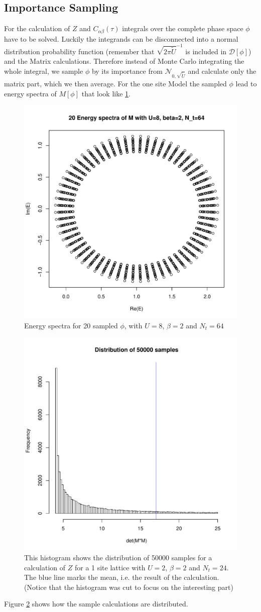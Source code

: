 \subsection{Importance Sampling}
For the calculation of $Z$ and $C_{\alpha\beta}(\tau)$ integrals over the complete phase space $\phi$ have to be solved. Luckily the integrands can be disconnected into a normal distribution probability function (remember that $\sqrt{2\pi\tilde{U}}^{-1}$ is included in $\mathcal{D}[\phi]$) and the Matrix calculations.
Therefore instead of Monte Carlo integrating the whole integral, we sample $\phi$ by its importance from $\mathcal{N}_{0, \sqrt{\tilde{U}}}$ and calculate only the matrix part, which we then average.
For the one site Model the sampled $\phi$ lead to energy spectra of $M[\phi]$ that look like \ref{fig:spectra}.
\begin{figure}[H]
	\centering
	\includegraphics[width=0.5\linewidth]{figs/spectra}
	\caption[Energy Spectra]{Energy spectra for 20 sampled $\phi$, with $U=8$, $\beta=2$ and $N_t=64$}
	\label{fig:spectra}
\end{figure}
\begin{figure}[H]
	\centering
	\includegraphics[width=0.7\linewidth]{figs/distribution}
	\caption[Distribution of 50000 samples]{This histogram shows the distribution of 50000 samples for a calculation of $Z$ for a 1 site lattice with $U=2$, $\beta=2$ and $N_t=24$. The blue line marks the mean, i.e. the result of the calculation. (Notice that the histogram was cut to focus on the interesting part)}
	\label{fig:distribution}
\end{figure}
Figure \ref{fig:distribution} shows how the sample calculations are distributed.